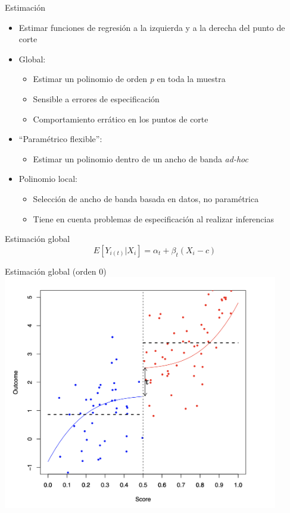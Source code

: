\documentclass[
  ignorenonframetext,
]{beamer}
\providecommand{\tightlist}{%
  \setlength{\itemsep}{0pt}\setlength{\parskip}{0pt}}
\begin{document}
\begin{frame}{Estimación}
\protect\hypertarget{estimaciuxf3n}{}
\begin{itemize}
\tightlist
\item
  Estimar funciones de regresión a la izquierda y a la derecha del punto
  de corte \pause
\item
  Global:

  \begin{itemize}
  \tightlist
  \item
    Estimar un polinomio de orden \emph{p} en toda la muestra
  \item
    Sensible a errores de especificación
  \item
    Comportamiento errático en los puntos de corte \pause
  \end{itemize}
\item
  ``Paramétrico flexible'':

  \begin{itemize}
  \tightlist
  \item
    Estimar un polinomio dentro de un ancho de banda \emph{ad-hoc}
    \pause
  \end{itemize}
\item
  Polinomio local:

  \begin{itemize}
  \tightlist
  \item
    Selección de ancho de banda basada en datos, no paramétrica
  \item
    Tiene en cuenta problemas de especificación al realizar inferencias
  \end{itemize}
\end{itemize}
\end{frame}

\begin{frame}{Estimación global}
\protect\hypertarget{estimaciuxf3n-global}{}
\[E[Y_{i(t)}|X_i] = \alpha_t + \beta_t(X_i - c)\]
\end{frame}

\begin{frame}{Estimación global (orden 0)}
\protect\hypertarget{estimaciuxf3n-global-orden-0}{}
\includegraphics[width=0.9\textwidth,height=\textheight]{p0}
\end{frame}
\end{document}
